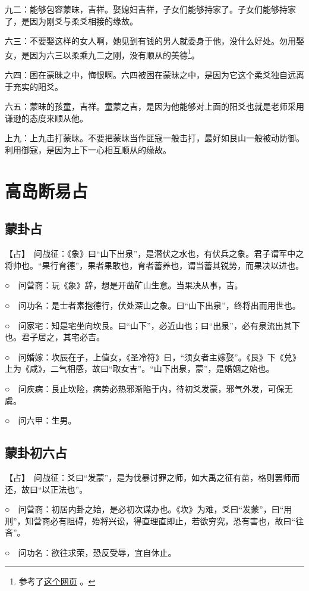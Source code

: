 \documentclass[12pt,oneside]{book}
\begin{document}
九二：能够包容蒙昧，吉祥。娶媳妇吉祥，子女们能够持家了。子女们能够持家了，是因为刚爻与柔爻相接的缘故。

六三：不要娶这样的女人啊，她见到有钱的男人就委身于他，没什么好处。勿用娶女，是因为六三以柔乘九二之刚，没有顺从的美德\footnote{参考了\href{http://www.guoxuez.com/64gua/menggua/23431.html}{这个网页} 。}。

六四：困在蒙昧之中，悔恨啊。六四被困在蒙昧之中，是因为它这个柔爻独自远离于充实的阳爻。

六五：蒙昧的孩童，吉祥。童蒙之吉，是因为他能够对上面的阳爻也就是老师采用谦逊的态度来顺从他。

上九：上九击打蒙昧。不要把蒙昧当作匪寇一般击打，最好如艮山一般被动防御。利用御寇，是因为上下一心相互顺从的缘故。


\section{高岛断易占}
\subsection{蒙卦占}
【占】　问战征：《象》曰“山下出泉”，是潜伏之水也，有伏兵之象。君子谓军中之将帅也。“果行育德”，果者果敢也，育者蓄养也，谓当蓄其锐势，而果决以进也。

○　问营商：玩《象》辞，想是开凿矿山生意。当果决从事，吉。

○　问功名：是士者素抱德行，伏处深山之象。曰“山下出泉”，终将出而用世也。

○　问家宅：知是宅坐向坎艮。曰“山下”，必近山也；曰“出泉”，必有泉流出其下也。君子居之，其宅必吉。

○　问婚嫁：坎辰在子，上值女，《圣冷符》曰，“须女者主嫁娶”。《艮》下《兑》上为《咸》，二气相感，故曰“取女吉”。“山下出泉，蒙”，是婚姻之始也。

○　问疾病：艮止坎险，病势必热邪渐陷于内，待初爻发蒙，邪气外发，可保无虞。

○　问六甲：生男。

\subsection{蒙卦初六占}
【占】　问战征：爻曰“发蒙”，是为伐暴讨罪之师，如大禹之征有苗，格则罢师而还，故曰“以正法也”。

○　问营商：初居内卦之始，是必初次谋办也。《坎》为难，爻曰“发蒙”，曰“用刑”，知营商必有阻碍，殆将兴讼，得直理直即止，若欲穷究，恐有害也，故曰“往吝”。

○　问功名：欲往求荣，恐反受辱，宜自休止。
\end{document}

